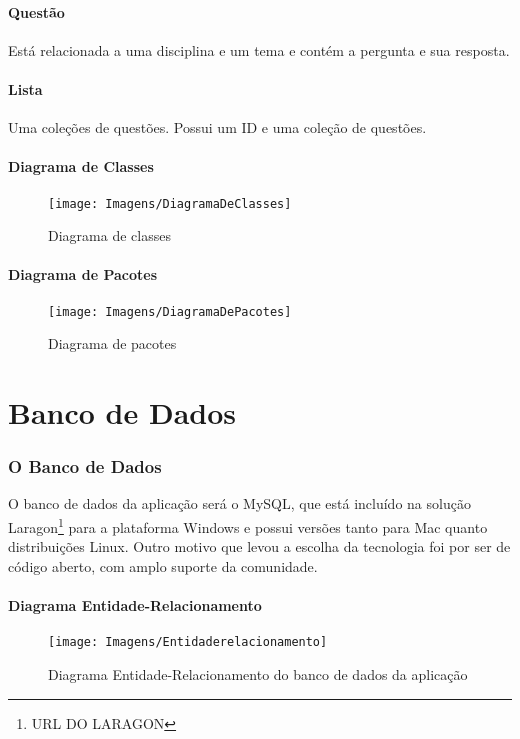 \documentclass[12pt,oneside,a4paper,article]{abntex2}
\begin{document}
		\subsection{Questão}
			Está relacionada a uma disciplina e um tema e contém a pergunta e sua resposta.
	
		\subsection{Lista}
			Uma coleções de questões. Possui um ID e uma coleção de questões.
		
		\subsection{Diagrama de Classes}
			\begin{figure}[h]
				\centering
				\texttt{[image: Imagens/DiagramaDeClasses]}
				\caption{Diagrama de classes}
				\label{fig:diagramaclasses}
			\end{figure}
		
		\subsection{Diagrama de Pacotes}
		\begin{figure}[h]
			\centering
			\texttt{[image: Imagens/DiagramaDePacotes]}
			\caption{Diagrama de pacotes}
			\label{fig:diagramapacotes}
		\end{figure}
			

\part{Banco de Dados}
	\section{O Banco de Dados}
		O banco de dados da aplicação será o MySQL, que está incluído na solução Laragon\footnote{URL DO LARAGON} para a plataforma Windows e possui versões tanto para Mac quanto distribuições Linux. Outro motivo que levou a escolha da tecnologia foi por ser de código aberto, com amplo suporte da comunidade.
		
		\subsection{Diagrama Entidade-Relacionamento}
			\begin{figure}[h]
				\centering
				\texttt{[image: Imagens/Entidaderelacionamento]}
				\caption{Diagrama Entidade-Relacionamento do banco de dados da aplicação}
				\label{fig:Entidaderelacionamento}
			\end{figure}
\end{document}
